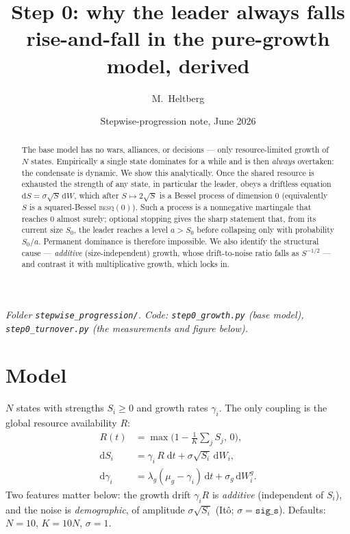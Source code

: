 \documentclass[11pt]{article}
\title{\textbf{Step 0: why the leader always falls}\\[2pt]
\large rise-and-fall in the pure-growth model, derived}
\author{M.\ Heltberg}
\date{Stepwise-progression note, June 2026}
\newcommand{\dd}{\mathrm{d}}
\begin{document}
\maketitle

\noindent\emph{Folder \texttt{stepwise\_progression/}. Code: \texttt{step0\_growth.py}
(base model), \texttt{step0\_turnover.py} (the measurements and figure below).}

\begin{abstract}
\noindent The base model has no wars, alliances, or decisions --- only
resource-limited growth of $N$ states. Empirically a single state dominates for a
while and is then \emph{always} overtaken: the condensate is dynamic. We show this
analytically. Once the shared resource is exhausted the strength of any state, in
particular the leader, obeys a driftless equation $\dd S=\sigma\sqrt S\,\dd W$,
which after $S\mapsto 2\sqrt S$ is a Bessel process of dimension $0$
(equivalently $S$ is a squared-Bessel \textsc{besq}$(0)$). Such a process is a
nonnegative martingale that reaches $0$ almost surely; optional stopping gives the
sharp statement that, from its current size $S_0$, the leader reaches a level
$a>S_0$ before collapsing only with probability $S_0/a$. Permanent dominance is
therefore impossible. We also identify the structural cause --- \emph{additive}
(size-independent) growth, whose drift-to-noise ratio falls as $S^{-1/2}$ --- and
contrast it with multiplicative growth, which locks in.
\end{abstract}

\section{Model}

$N$ states with strengths $S_i\ge0$ and growth rates $\gamma_i$. The only coupling
is the global resource availability $R$:
\begin{align}
R(t)&=\max\!\Big(1-\tfrac1K\textstyle\sum_j S_j,\,0\Big),\label{eq:R}\\
\dd S_i&=\gamma_i\,R\;\dd t+\sigma\sqrt{S_i}\,\dd W_i,\label{eq:S}\\
\dd \gamma_i&=\lambda_g(\mu_g-\gamma_i)\,\dd t+\sigma_g\,\dd W^g_i.\label{eq:g}
\end{align}
Two features matter below: the growth drift $\gamma_i R$ is \emph{additive}
(independent of $S_i$), and the noise is \emph{demographic}, of amplitude
$\sigma\sqrt{S_i}$ (Itô; $\sigma=\texttt{sig\_s}$). Defaults: $N=10$, $K=10N$,
$\sigma=1$.
\end{document}
